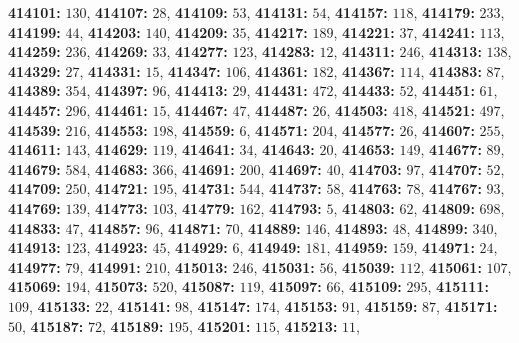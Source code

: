 \textsf{\bfseries 414101:} $130$, \textsf{\bfseries 414107:} $28$, \textsf{\bfseries 414109:} $53$, \textsf{\bfseries 414131:} $54$, \textsf{\bfseries 414157:} $118$, \textsf{\bfseries 414179:} $233$, \textsf{\bfseries 414199:} $44$, \textsf{\bfseries 414203:} $140$, \textsf{\bfseries 414209:} $35$, \textsf{\bfseries 414217:} $189$, \textsf{\bfseries 414221:} $37$, \textsf{\bfseries 414241:} $113$, \textsf{\bfseries 414259:} $236$, \textsf{\bfseries 414269:} $33$, \textsf{\bfseries 414277:} $123$, \textsf{\bfseries 414283:} $12$, \textsf{\bfseries 414311:} $246$, \textsf{\bfseries 414313:} $138$, \textsf{\bfseries 414329:} $27$, \textsf{\bfseries 414331:} $15$, \textsf{\bfseries 414347:} $106$, \textsf{\bfseries 414361:} $182$, \textsf{\bfseries 414367:} $114$, \textsf{\bfseries 414383:} $87$, \textsf{\bfseries 414389:} $354$, \textsf{\bfseries 414397:} $96$, \textsf{\bfseries 414413:} $29$, \textsf{\bfseries 414431:} $472$, \textsf{\bfseries 414433:} $52$, \textsf{\bfseries 414451:} $61$, \textsf{\bfseries 414457:} $296$, \textsf{\bfseries 414461:} $15$, \textsf{\bfseries 414467:} $47$, \textsf{\bfseries 414487:} $26$, \textsf{\bfseries 414503:} $418$, \textsf{\bfseries 414521:} $497$, \textsf{\bfseries 414539:} $216$, \textsf{\bfseries 414553:} $198$, \textsf{\bfseries 414559:} $6$, \textsf{\bfseries 414571:} $204$, \textsf{\bfseries 414577:} $26$, \textsf{\bfseries 414607:} $255$, \textsf{\bfseries 414611:} $143$, \textsf{\bfseries 414629:} $119$, \textsf{\bfseries 414641:} $34$, \textsf{\bfseries 414643:} $20$, \textsf{\bfseries 414653:} $149$, \textsf{\bfseries 414677:} $89$, \textsf{\bfseries 414679:} $584$, \textsf{\bfseries 414683:} $366$, \textsf{\bfseries 414691:} $200$, \textsf{\bfseries 414697:} $40$, \textsf{\bfseries 414703:} $97$, \textsf{\bfseries 414707:} $52$, \textsf{\bfseries 414709:} $250$, \textsf{\bfseries 414721:} $195$, \textsf{\bfseries 414731:} $544$, \textsf{\bfseries 414737:} $58$, \textsf{\bfseries 414763:} $78$, \textsf{\bfseries 414767:} $93$, \textsf{\bfseries 414769:} $139$, \textsf{\bfseries 414773:} $103$, \textsf{\bfseries 414779:} $162$, \textsf{\bfseries 414793:} $5$, \textsf{\bfseries 414803:} $62$, \textsf{\bfseries 414809:} $698$, \textsf{\bfseries 414833:} $47$, \textsf{\bfseries 414857:} $96$, \textsf{\bfseries 414871:} $70$, \textsf{\bfseries 414889:} $146$, \textsf{\bfseries 414893:} $48$, \textsf{\bfseries 414899:} $340$, \textsf{\bfseries 414913:} $123$, \textsf{\bfseries 414923:} $45$, \textsf{\bfseries 414929:} $6$, \textsf{\bfseries 414949:} $181$, \textsf{\bfseries 414959:} $159$, \textsf{\bfseries 414971:} $24$, \textsf{\bfseries 414977:} $79$, \textsf{\bfseries 414991:} $210$, \textsf{\bfseries 415013:} $246$, \textsf{\bfseries 415031:} $56$, \textsf{\bfseries 415039:} $112$, \textsf{\bfseries 415061:} $107$, \textsf{\bfseries 415069:} $194$, \textsf{\bfseries 415073:} $520$, \textsf{\bfseries 415087:} $119$, \textsf{\bfseries 415097:} $66$, \textsf{\bfseries 415109:} $295$, \textsf{\bfseries 415111:} $109$, \textsf{\bfseries 415133:} $22$, \textsf{\bfseries 415141:} $98$, \textsf{\bfseries 415147:} $174$, \textsf{\bfseries 415153:} $91$, \textsf{\bfseries 415159:} $87$, \textsf{\bfseries 415171:} $50$, \textsf{\bfseries 415187:} $72$, \textsf{\bfseries 415189:} $195$, \textsf{\bfseries 415201:} $115$, \textsf{\bfseries 415213:} $11$, 
